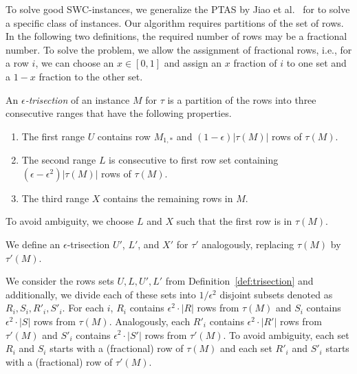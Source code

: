 To solve good SWC-instances, we generalize the PTAS by Jiao et al.~\cite{JXL04_k} for \BMEC to solve a specific class of \GMEC instances. 
Our algorithm requires partitions of the set of rows.
In the following two definitions, the required number of rows may be a fractional number. 
To solve the problem, we allow the assignment of fractional rows, i.e., for a row $i$, we can choose an $x \in [0,1]$ and assign an $x$ fraction of $i$ to one set and a $1-x$ fraction to the other set. 
\begin{definition}[Trisection]
    An \emph{$\epsilon$-trisection} of an instance $M$ for $\tau$ is a partition of the rows into three consecutive ranges that have the following properties.
    \begin{enumerate}
        \item The first range $U$ contains row $M_{1,*}$ and $(1-\epsilon) |\tau(M)|$ rows of $\tau(M)$.
        \item The second range $L$ is consecutive to first row set containing $(\epsilon - \epsilon^2)|\tau(M)|$ rows of $\tau(M)$.
        \item The third range $X$ contains the remaining rows in $M$.
    \end{enumerate}
    To avoid ambiguity, we choose $L$ and $X$ such that the first row is in $\tau(M)$.

    We define an $\epsilon$-trisection $U'$, $L'$, and $X'$ for $\tau'$ analogously, replacing $\tau(M)$ by $\tau'(M)$.
    \label{def:trisection}
\end{definition}

\begin{definition}
    We consider the rows sets $U, L, U', L'$ from Definition~\ref{def:trisection} and additionally, we divide each of these sets into $1/\epsilon^2$ disjoint subsets denoted as $R_i, S_i, R'_i, S'_i$.
    For each $i$, $R_i$ contains $\epsilon^2 \cdot |R|$ rows from $\tau(M)$ and $S_i$ contains $\epsilon^2 \cdot |S|$ rows from $\tau(M)$.
    Analogously, each $R'_i$ contains $\epsilon^2 \cdot |R'|$ rows from $\tau'(M)$ and $S'_i$ contains $\epsilon^2 \cdot |S'|$ rows from $\tau'(M)$.
    To avoid ambiguity, each set $R_i$ and $S_i$ starts with a (fractional) row of $\tau(M)$ and each set $R'_i$ and $S'_i$ starts with a (fractional) row of $\tau'(M)$. 
    \label{def:subdivision}
\end{definition}

